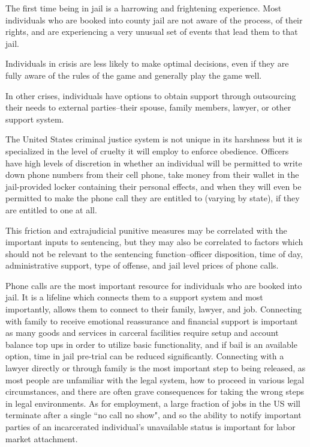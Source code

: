 \documentclass[12pt, a4paper]{article}
\begin{document}
The first time being in jail is a harrowing and frightening experience. Most individuals who are booked into county jail are not aware of the process, of their rights, and are experiencing a very unusual set of events that lead them to that jail. 

Individuals in crisis are less likely to make optimal decisions, even if they are fully aware of the rules of the game and generally play the game well. 

In other crises, individuals have options to obtain support through outsourcing their needs to external parties--their spouse, family members, lawyer, or other support system. 

The United States criminal justice system is not unique in its harshness but it is specialized in the level of cruelty it will employ to enforce obedience. Officers have high levels of discretion in whether an individual will be permitted to write down phone numbers from their cell phone, take money from their wallet in the jail-provided locker containing their personal effects, and when they will even be permitted to make the phone call they are entitled to (varying by state), if they are entitled to one at all. 

This friction and extrajudicial punitive measures may be correlated with the important inputs to sentencing, but they may also be correlated to factors which should not be relevant to the sentencing function--officer disposition, time of day, administrative support, type of offense, and jail level prices of phone calls. 

Phone calls are the most important resource for individuals who are booked into jail. It is a lifeline which connects them to a support system and most importantly, allows them to connect to their family, lawyer, and job. Connecting with family to receive emotional reassurance and financial support is important as many goods and services in carceral facilities require setup and account balance top ups in order to utilize basic functionality, and if bail is an available option, time in jail pre-trial can be reduced significantly. Connecting with a lawyer directly or through family is the most important step to being released, as most people are unfamiliar with the legal system, how to proceed in various legal circumstances, and there are often grave consequences for taking the wrong steps in legal environments. As for employment, a large fraction of jobs in the US will terminate after a single ``no call no show", and so the ability to notify important parties of an incarcerated individual's unavailable status is important for labor market attachment. 
\end{document}
